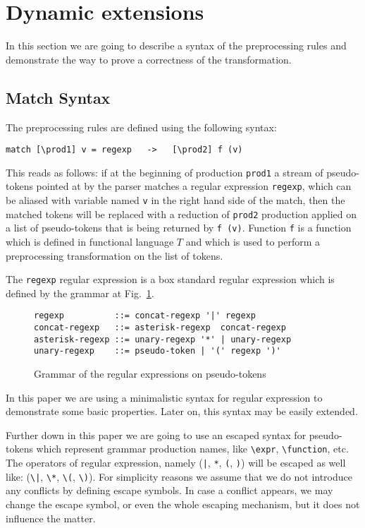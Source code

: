 \section{\label{sec:dynext}Dynamic extensions}

In this section we are going to describe a syntax of the preprocessing
rules and demonstrate the way to prove a correctness of the
transformation.

\subsection{Match Syntax}

The preprocessing rules are defined using the following syntax:
\begin{verbatim}
match [\prod1] v = regexp   ->   [\prod2] f (v)
\end{verbatim}
This reads as follows: if at the beginning of production \verb|prod1|
a stream of pseudo-tokens pointed at by the parser matches a regular expression
\verb|regexp|, which can be aliased with variable named \verb|v| in the
right hand side of the match, then the matched tokens will be replaced 
with a reduction of \verb|prod2| production applied on a list of 
pseudo-tokens that is being returned by \verb|f (v)|.  Function \verb|f|
is a function which is defined in functional language $T$ and which
is used to perform a preprocessing transformation on the list of 
tokens.  

The \verb|regexp| regular expression is a box standard regular
expression which is defined by the grammar at Fig.~\ref{fig:reggram}.
\begin{figure}[h!]
\begin{verbatim}
regexp          ::= concat-regexp '|' regexp
concat-regexp   ::= asterisk-regexp  concat-regexp
asterisk-regexp ::= unary-regexp '*' | unary-regexp
unary-regexp    ::= pseudo-token | '(' regexp ')'
\end{verbatim}
\caption{\label{fig:reggram}Grammar of the regular expressions on
pseudo-tokens}
\end{figure}
In this paper we are using a minimalistic syntax for regular expression
to demonstrate some basic properties.  Later on, this syntax may be 
easily extended.

Further down in this paper we are going to use an escaped syntax 
for pseudo-tokens which represent grammar production names, like
\verb|\expr|, \verb|\function|, etc.  The operators of regular
expression, namely (\verb/|/, \verb|*|, \verb|(|, \verb|)|) will
be escaped as well like: (\verb/\|/, \verb|\*|, \verb|\(|, \verb|\)|).
For simplicity reasons we assume that we do not introduce
any conflicts by defining escape symbols.  In case a conflict 
appears, we may change the escape symbol, or even the whole escaping
mechanism, but it does not influence the matter.

